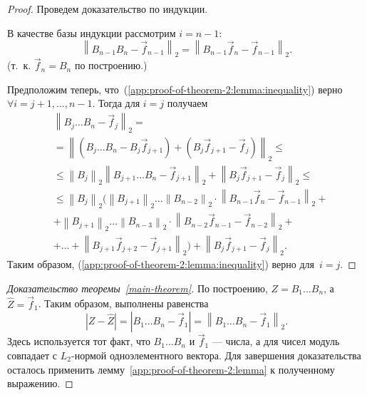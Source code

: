 \begin{proof}
Проведем доказательство по индукции.

В качестве базы индукции рассмотрим $i = n - 1$:
\begin{equation*}
\left\| B_{n - 1}B_n - \vec{f}_{n - 1} \right\|_2 = \left\| B_{n - 1}\vec{f}_n - \vec{f}_{n - 1} \right\|_2.
\end{equation*}
(т.~к. $\vec{f}_n = B_n$ по построению.)

Предположим теперь, что~(\ref{app:proof-of-theorem-2:lemma:inequality}) верно $\forall i = j + 1, \ldots, n - 1$. Тогда для $i = j$ получаем
\begin{align*}
&\left\| B_j \ldots B_n - \vec{f}_j \right\|_2 = \\
& = \left\| (B_j \ldots B_n - B_j\vec{f}_{j + 1}) + (B_j\vec{f}_{j + 1} - \vec{f}_j) \right\|_2 \leq \\
& \leq \left\| B_j \right\|_2 \left\| B_{j + 1} \ldots B_n - \vec{f}_{j + 1} \right\|_2 + \left\| B_j\vec{f}_{j + 1} - \vec{f}_j \right\|_2 \leq \\
&\leq \left\| B_j \right\|_2 (
\left\| B_{j + 1} \right\|_2 \ldots \left\| B_{n - 2} \right\|_2 \cdot \left\| B_{n - 1}\vec{f}_n - \vec{f}_{n - 1}\right\|_2 + \\
& + \left\| B_{j + 1} \right\|_2 \ldots \left\| B_{n - 3} \right\|_2 \cdot \left\| B_{n - 2}\vec{f}_{n - 1} - \vec{f}_{n - 2} \right\|_2 +  \\
& + \ldots + \left\| B_{j + 1}\vec{f}_{j + 2} - \vec{f}_{j + 1} \right\|_2
) + \left\| B_j\vec{f}_{j + 1} - \vec{f}_j \right\|_2.
\end{align*}
Таким образом, (\ref{app:proof-of-theorem-2:lemma:inequality}) верно для~$i = j$.
\end{proof}

\begin{proof}[Доказательство теоремы~\ref{main-theorem}]
По построению, $Z = B_1 \ldots B_n$, а $\widehat{Z} = \vec{f}_1$. Таким образом, выполнены равенства
\begin{equation*}
\label{app:proof-of-theorem-2:difference-as-matrix-norm}
|Z - \widehat{Z}| = |B_1 \ldots B_n - \vec{f}_1| = \left\| B_1 \ldots B_n - \vec{f}_1 \right\|_2.
\end{equation*}
Здесь используется тот факт, что $B_1 \ldots B_n$ и $\vec{f}_1$ --- числа, а для чисел модуль совпадает с $L_2$-нормой одноэлементного вектора. Для завершения доказательства осталось применить лемму~\ref{app:proof-of-theorem-2:lemma} к полученному выражению.
\end{proof}

